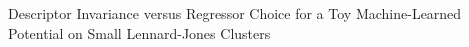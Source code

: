 Descriptor Invariance versus Regressor Choice for a Toy Machine-Learned Potential on Small Lennard-Jones Clusters
